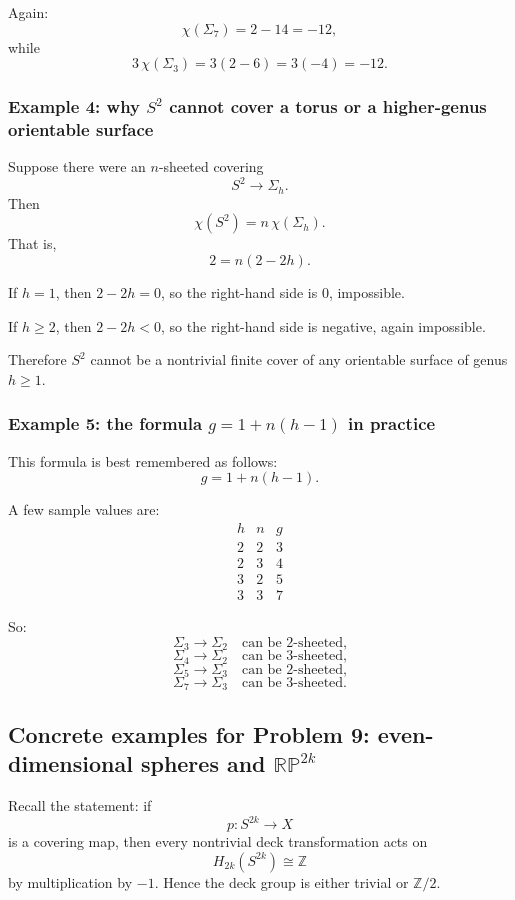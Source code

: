 \documentclass[12pt,a4paper]{article}
\newcommand{\Z}{\mathbb{Z}}
\newcommand{\RP}{\mathbb{RP}}
\theoremstyle{notespace}
\begin{document}
Again:
\[
\chi(\Sigma_7)=2-14=-12,
\]
while
\[
3\,\chi(\Sigma_3)=3(2-6)=3(-4)=-12.
\]

\subsubsection*{Example 4: why \(S^2\) cannot cover a torus or a higher-genus orientable surface}

Suppose there were an \(n\)-sheeted covering
\[
S^2\to \Sigma_h.
\]
Then
\[
\chi(S^2)=n\,\chi(\Sigma_h).
\]
That is,
\[
2=n(2-2h).
\]

If \(h=1\), then \(2-2h=0\), so the right-hand side is \(0\), impossible.

If \(h\ge 2\), then \(2-2h<0\), so the right-hand side is negative, again impossible.

Therefore \(S^2\) cannot be a nontrivial finite cover of any orientable surface of genus \(h\ge 1\).

\subsubsection*{Example 5: the formula \(g=1+n(h-1)\) in practice}

This formula is best remembered as follows:
\[
\boxed{g=1+n(h-1).}
\]

A few sample values are:
\[
\begin{array}{c|c|c}
	h & n & g \\ \hline
	2 & 2 & 3 \\
	2 & 3 & 4 \\
	3 & 2 & 5 \\
	3 & 3 & 7
\end{array}
\]

So:
\[
\Sigma_3\to\Sigma_2 \quad \text{can be 2-sheeted,}
\]
\[
\Sigma_4\to\Sigma_2 \quad \text{can be 3-sheeted,}
\]
\[
\Sigma_5\to\Sigma_3 \quad \text{can be 2-sheeted,}
\]
\[
\Sigma_7\to\Sigma_3 \quad \text{can be 3-sheeted.}
\]

\subsection{Concrete examples for Problem 9: even-dimensional spheres and \(\RP^{2k}\)}

Recall the statement: if
\[
p:S^{2k}\to X
\]
is a covering map, then every nontrivial deck transformation acts on
\[
H_{2k}(S^{2k})\cong \Z
\]
by multiplication by \(-1\). Hence the deck group is either trivial or \(\Z/2\).
\end{document}
